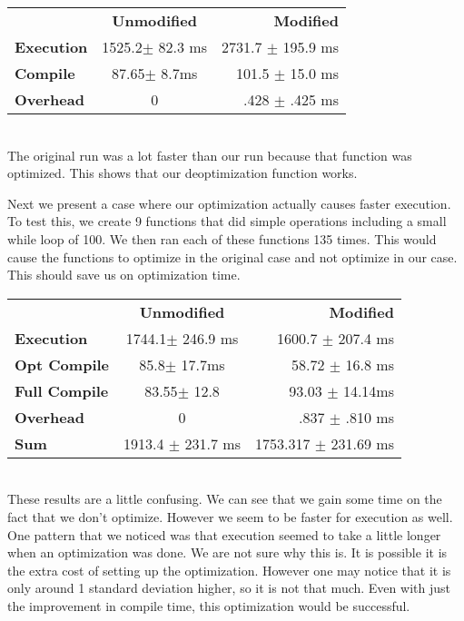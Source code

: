 \documentclass[twocolumn,showpacs,%
  nofootinbib,aps,superscriptaddress,%
  eqsecnum,prd,notitlepage,showkeys,10pt]{revtex4-1}
\begin{document}
\begin{tabular}{ l c r }
  & \textbf{Unmodified} & \textbf{Modified} \\
\textbf{Execution} &  1525.2$\pm$ 82.3 ms &  2731.7 $\pm$ 195.9 ms \\
\textbf{Compile} & 87.65$\pm$ 8.7ms & 101.5 $\pm$ 15.0 ms \\
\textbf{Overhead} &  0   &   .428 $\pm$ .425 ms  \\
\end{tabular}\\

The original run was a lot faster than our run because that function was optimized. This shows that our deoptimization function works.

Next we present a case where our optimization actually causes faster execution. To test this, we create 9 functions that did simple operations including a small while loop of 100. We then ran each of these functions 135 times. This would cause the functions to optimize in the original case and not optimize in our case. This should save us on optimization time.\\

\begin{tabular}{ l c r }
  & \textbf{Unmodified} & \textbf{Modified} \\
\textbf{Execution} &  1744.1$\pm$ 246.9 ms &  1600.7 $\pm$ 207.4 ms \\
\textbf{Opt Compile} & 85.8$\pm$  17.7ms & 58.72 $\pm$ 16.8 ms \\
\textbf{Full Compile} &  83.55$\pm$ 12.8 & 93.03 $\pm$ 14.14ms\\ 
\textbf{Overhead} &  0   &   .837 $\pm$ .810 ms  \\
\textbf{Sum} & 1913.4 $\pm$ 231.7 ms & 1753.317 $\pm$ 231.69 ms \\
\end{tabular}\\

These results are a little confusing. We can see that we gain some time on the fact that we don't optimize. However we seem to be faster for execution as well. One pattern that we noticed was that execution seemed to take a little longer when an optimization was done. We are not sure why this is. It is possible it is the extra cost of setting up the optimization. However one may notice that it is only around 1 standard deviation higher, so it is not that much. Even with just the improvement in compile time, this optimization would be successful. 
\end{document}
